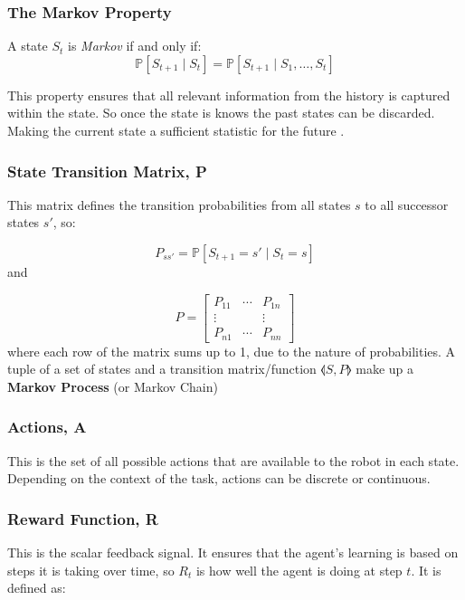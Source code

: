   \subsubsection{The Markov Property}
    A state $S_t$ is \emph{Markov} if and only if:
    \[
      \mathbb{P} \left[S_{t+1} \mid S_t\right] = \mathbb{P}\left[ S_{t+1} \mid S_1, \ldots, S_t\right]
    \]

    This property ensures that all relevant information from the history is captured within the state. So once the state is knows the past states can be discarded. Making the current state a sufficient statistic for the future \cite{silver2015}.

  \subsubsection{State Transition Matrix, P}
    This matrix defines the transition probabilities from all states $s$ to all successor states $s'$, so:
    
    \[ P_{ss'} = \mathbb{P} \left[S_{t+1} = s'  \mid S_t = s\right]\] 
    and 
    
    \[ P =
    \begin{bmatrix}
      P_{11} & \cdots & P_{1n} \\ 
      \vdots & & \vdots\\
      P_{n1} & \cdots & P_{nn}
    \end{bmatrix}
    \]
    where each row of the matrix sums up to 1, due to the nature of probabilities. A tuple of a set of states and a transition matrix/function \(\llangle S, P \rrangle\) make up a \textbf{Markov Process} (or Markov Chain)

  \subsubsection{Actions, A}
    This is the set of all possible actions that are available to the robot in each state. Depending on the context of the task, actions can be discrete or continuous.

  \subsubsection{Reward Function, R}
    This is the scalar feedback signal. It ensures that the agent's learning is based on steps it is taking over time, so $R_t$ is how well the agent is doing at step $t$. It is defined as:

